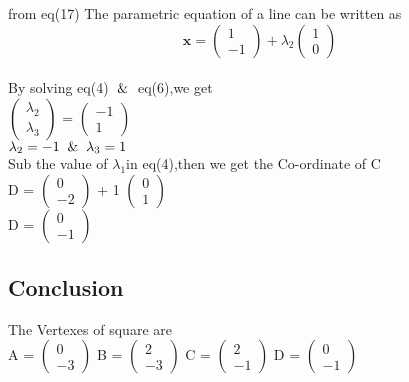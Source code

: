 \documentclass[journal,10pt,twocolumn]{article}
\newcommand{\myvec}[1]{\ensuremath{\begin{pmatrix}#1\end{pmatrix}}}
\begin{document}
\begin{flushleft}
from eq(17) The parametric equation of a line can be written as
\begin{equation}
     \boldsymbol{x} = \myvec{1 \\ -1} + \lambda_2\myvec{1 \\ 0}
\end{equation}
\vspace{0.3cm}\\
By solving eq(4) $\And$ eq(6),we get
\vspace{0.3cm}\\
 \myvec{\lambda_2 \\ \lambda_3} =  \myvec{-1 \\ 1}
\vspace{0.3cm}\\
$\lambda_2=-1 \And \lambda_3=1$
\vspace{0.3cm}\\
Sub the value of $\lambda_1$in eq(4),then we get the Co-ordinate of C
\vspace{0.3cm}\\
D =  \myvec{0 \\ -2} + 1  \myvec{0 \\ 1}
\vspace{0.3cm}\\
D = \myvec{0 \\ -1}
\subsection{Conclusion}
The Vertexes of square are
\vspace{0.3cm}\\
A = \myvec{0 \\ -3} B = \myvec{2 \\ -3} C = \myvec{2 \\ -1} D = \myvec{0 \\ -1}
\end{flushleft}
\end{document}
